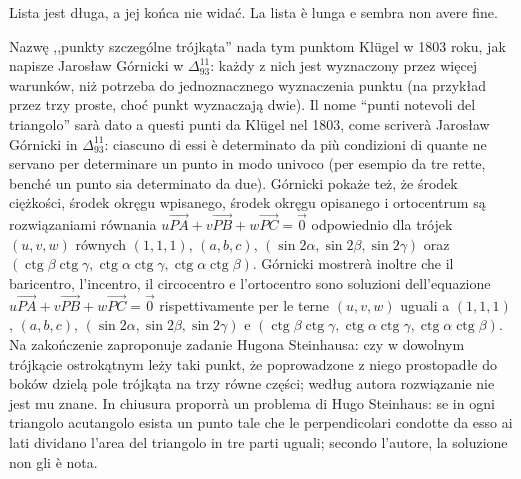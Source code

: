 Lista jest długa, a jej końca nie widać. %
La lista è lunga e sembra non avere fine. %

Nazwę ,,punkty szczególne trójkąta'' nada tym punktom Klügel w 1803 roku, jak napisze Jarosław Górnicki w $\Delta_{93}^{11}$: każdy z nich jest wyznaczony przez więcej warunków, niż potrzeba do jednoznacznego wyznaczenia punktu (na przykład przez trzy proste, choć punkt wyznaczają dwie). %
Il nome ``punti notevoli del triangolo'' sarà dato a questi punti da Klügel nel 1803, come scriverà Jarosław Górnicki in $\Delta_{93}^{11}$: ciascuno di essi è determinato da più condizioni di quante ne servano per determinare un punto in modo univoco (per esempio da tre rette, benché un punto sia determinato da due). %
Górnicki pokaże też, że środek ciężkości, środek okręgu wpisanego, środek okręgu opisanego i ortocentrum są rozwiązaniami równania $u \overrightarrow{PA} + v \overrightarrow{PB} + w \overrightarrow{PC} = \vec 0$ odpowiednio dla trójek $(u, v, w)$ równych $(1, 1, 1)$, $(a, b, c)$, $(\sin 2\alpha, \sin 2\beta, \sin 2\gamma)$ oraz $(\operatorname{ctg} \beta \operatorname{ctg} \gamma, \operatorname{ctg} \alpha \operatorname{ctg} \gamma, \operatorname{ctg} \alpha \operatorname{ctg} \beta)$. %
Górnicki mostrerà inoltre che il baricentro, l'incentro, il circocentro e l'ortocentro sono soluzioni dell'equazione $u \overrightarrow{PA} + v \overrightarrow{PB} + w \overrightarrow{PC} = \vec 0$ rispettivamente per le terne $(u, v, w)$ uguali a $(1, 1, 1)$, $(a, b, c)$, $(\sin 2\alpha, \sin 2\beta, \sin 2\gamma)$ e $(\operatorname{ctg} \beta \operatorname{ctg} \gamma, \operatorname{ctg} \alpha \operatorname{ctg} \gamma, \operatorname{ctg} \alpha \operatorname{ctg} \beta)$. %
Na zakończenie zaproponuje zadanie Hugona Steinhausa: czy w dowolnym trójkącie ostrokątnym leży taki punkt, że poprowadzone z niego prostopadłe do boków dzielą pole trójkąta na trzy równe części; według autora rozwiązanie nie jest mu znane. %
In chiusura proporrà un problema di Hugo Steinhaus: se in ogni triangolo acutangolo esista un punto tale che le perpendicolari condotte da esso ai lati dividano l'area del triangolo in tre parti uguali; secondo l'autore, la soluzione non gli è nota. %








%